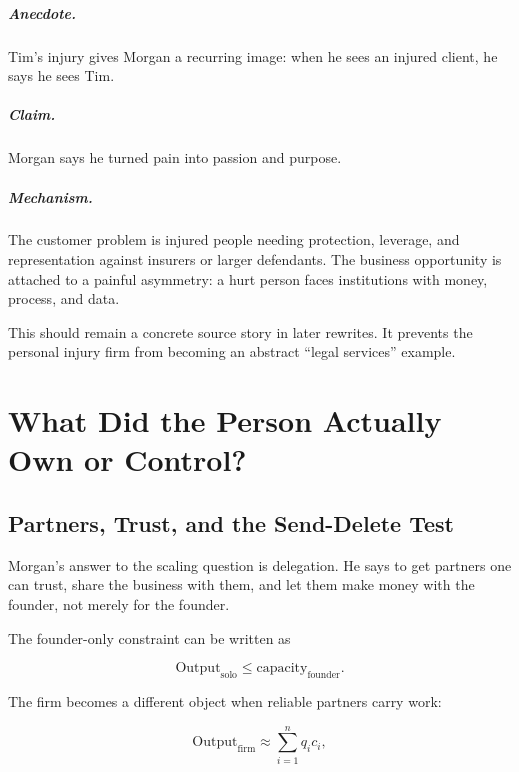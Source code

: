 \documentclass[11pt,oneside]{book}
\begin{document}
\paragraph{Anecdote.}
Tim's injury gives Morgan a recurring image: when he sees an injured client, he says he sees Tim.

\paragraph{Claim.}
Morgan says he turned pain into passion and purpose.

\paragraph{Mechanism.}
The customer problem is injured people needing protection, leverage, and representation against insurers or larger defendants. The business opportunity is attached to a painful asymmetry: a hurt person faces institutions with money, process, and data.

This should remain a concrete source story in later rewrites. It prevents the personal injury firm from becoming an abstract ``legal services'' example.

\chapter{What Did the Person Actually Own or Control?}

\section{Partners, Trust, and the Send-Delete Test}

Morgan's answer to the scaling question is delegation. He says to get partners one can trust, share the business with them, and let them make money with the founder, not merely for the founder.

The founder-only constraint can be written as

\begin{equation}
\mathrm{Output}_{\mathrm{solo}}
\leq
\mathrm{capacity}_{\mathrm{founder}}.
\end{equation}

The firm becomes a different object when reliable partners carry work:

\begin{equation}
\mathrm{Output}_{\mathrm{firm}}
\approx
\sum_{i=1}^{n} q_i c_i,
\end{equation}
\end{document}
